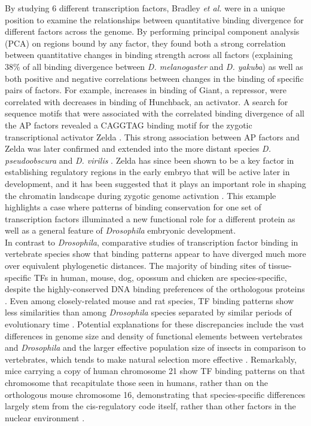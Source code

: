 By studying 6 different transcription factors, Bradley \emph{et al.} were in a unique position to examine the relationships between quantitative binding divergence for different factors across the genome. By performing principal component analysis (PCA) on regions bound by any factor, they found both a strong correlation between quantitative changes in binding strength across all factors (explaining 38\% of all binding divergence between \emph{D. melanogaster} and \emph{D. yakuba}) as well as both positive and negative correlations between changes in the binding of specific pairs of factors. For example, increases in binding of Giant, a repressor, were correlated with decreases in binding of Hunchback, an activator. A search for sequence motifs that were associated with the correlated binding divergence of all the AP factors revealed a CAGGTAG binding motif for the zygotic transcriptional activator Zelda \citep{bradley_binding_2010}. This strong association between AP factors and Zelda was later confirmed and extended into the more distant species \emph{D. pseudoobscura} and \emph{D. virilis} \citep{paris_extensive_2013}. Zelda has since been shown to be a key factor in establishing regulatory regions in the early embryo that will be active later in development, and it has been suggested that it plays an important role in shaping the chromatin landscape during zygotic genome activation \citep{harrison_zelda_2011,satija_tagteam_2012}. This example highlights a case where patterns of binding conservation for one set of transcription factors illuminated a new functional role for a different protein as well as a general feature of \emph{Drosophila} embryonic development.\\

In contrast to \emph{Drosophila}, comparative studies of transcription factor binding in vertebrate species show that binding patterns appear to have diverged much more over equivalent phylogenetic distances. The majority of binding sites of tissue-specific TFs in human, mouse, dog, opossum and chicken are species-specific, despite the highly-conserved DNA binding preferences of the orthologous proteins \citep{odom_tissue-specific_2007,schmidt_five-vertebrate_2010}. Even among closely-related mouse and rat species, TF binding patterns show less similarities than among \emph{Drosophila} species separated by similar periods of evolutionary time \citep{stefflova_cooperativity_2013}. Potential explanations for these discrepancies include the vast differences in genome size and density of functional elements between vertebrates and \emph{Drosophila} and the larger effective population size of insects in comparison to vertebrates, which tends to make natural selection more effective \citep{villar_evolution_2014}. Remarkably, mice carrying a copy of human chromosome 21 show TF binding patterns on that chromosome that recapitulate those seen in humans, rather than on the orthologous mouse chromosome 16, demonstrating that species-specific differences largely stem from the cis-regulatory code itself, rather than other factors in the nuclear environment \citep{wilson_species-specific_2008}.\\

